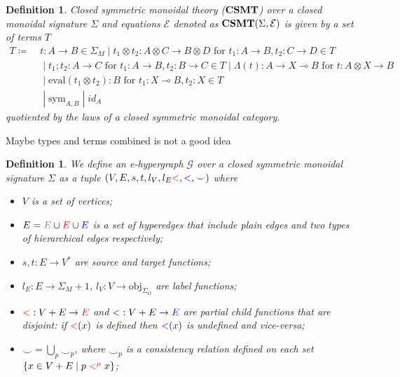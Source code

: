 \documentclass[acmsmall, screen, nonacm]{acmart}
\newcommand{\consistency}{{\smile}}
\newtheorem{definition}[theorem]{Definition}
\newcommand\question[1]{{\color{azure}#1}}
\begin{document}
\begin{definition}
 Closed symmetric monoidal theory ($\mathbf{CSMT}$) over a closed monoidal signature $\Sigma$ and equations $\mathcal{E}$ denoted as $\mathbf{CSMT}(\Sigma, \mathcal{E})$ is given by a set of terms $T$
 \begin{align*}
 T \coloneq\; &t : A \to B \in \Sigma_{M} \;|\; t_1 \otimes t_2 : A \otimes C \to B \otimes D \text{ for } t_{1} : A \to B, t_{2} : C \to D \in T\\
            & \;|\; t_{1};t_{2} : A \to C \text{ for } t_{1} : A \to B, t_{2} : B \to C \in T \; | \;  \Lambda(t) : A \to X \multimap B \text{ for } t : A \otimes X \to B \\
            &  \;|\; \text{eval}(t_1 \otimes t_2) : B \text{ for } t_1 : X \multimap B, t_2 : X \in T \\
            &  \;|\; \text{sym}_{A,B} \;|\; id_{A}
 \end{align*}
 quotiented by the laws of a closed symmetric monoidal category.
\end{definition}
\question{Maybe types and terms combined is not a good idea}
\begin{definition}

We define an e-hypergraph $\mathcal{G}$ over a closed symmetric monoidal signature $\Sigma$ as a tuple $(V,E,s,t, l_{V}, l_{E} \textcolor{red}{<}, \textcolor{blue}{<},\consistency)$ where
\begin{itemize}
  \item $V$ is a set of vertices;
  \item $E = \textcolor{gray}{E} \cup \textcolor{red}{E} \cup \textcolor{blue}{E}$ is a set of hyperedges that include \textit{plain} edges and two types of \textit{hierarchical} edges respectively;
  \item $s,t : E \to V^{*}$ are source and target functions;
  \item $l_{E} : E \to \Sigma_{M} + 1$, $l_{V} : V \to \text{obj}_{\Sigma_{O}}$ are \textit{label} functions;
  \item $\textcolor{red}{<} : V + E \to \textcolor{red}{E}$ and $\textcolor{blue}{<} : V + E \to \textcolor{blue}{E}$ are partial \textit{child} functions that are disjoint: if $\textcolor{red}{<}(x)$ is defined then $\textcolor{blue}{<}(x)$ is undefined and vice-versa;
  \item $\consistency = \bigcup_{p} \consistency_{p}$, where $\consistency_{p}$ is a \textit{consistency} relation defined on each set $\{x \in V + E \;|\; p \;\textcolor{red}{<^{\mu}}\; x\}$;
\end{itemize} 
\end{definition}
\end{document}
